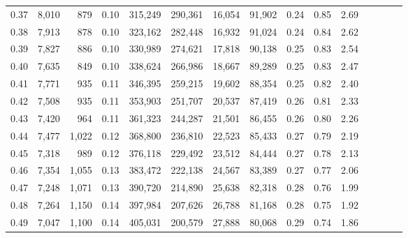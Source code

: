 \begin{tabular}{rrrcrrrrrrrrrrr}
0.37 &   8,010 &    879 &                                       0.10 &  315,249 &  290,361 &   16,054 &   91,902 &  0.24 &  0.85 &                         2.69 \\
0.38 &   7,913 &    878 &                                       0.10 &  323,162 &  282,448 &   16,932 &   91,024 &  0.24 &  0.84 &                         2.62 \\
0.39 &   7,827 &    886 &                                       0.10 &  330,989 &  274,621 &   17,818 &   90,138 &  0.25 &  0.83 &                         2.54 \\
0.40 &   7,635 &    849 &                                       0.10 &  338,624 &  266,986 &   18,667 &   89,289 &  0.25 &  0.83 &                         2.47 \\
0.41 &   7,771 &    935 &                                       0.11 &  346,395 &  259,215 &   19,602 &   88,354 &  0.25 &  0.82 &                         2.40 \\
0.42 &   7,508 &    935 &                                       0.11 &  353,903 &  251,707 &   20,537 &   87,419 &  0.26 &  0.81 &                         2.33 \\
0.43 &   7,420 &    964 &                                       0.11 &  361,323 &  244,287 &   21,501 &   86,455 &  0.26 &  0.80 &                         2.26 \\
0.44 &   7,477 &  1,022 &                                       0.12 &  368,800 &  236,810 &   22,523 &   85,433 &  0.27 &  0.79 &                         2.19 \\
0.45 &   7,318 &    989 &                                       0.12 &  376,118 &  229,492 &   23,512 &   84,444 &  0.27 &  0.78 &                         2.13 \\
0.46 &   7,354 &  1,055 &                                       0.13 &  383,472 &  222,138 &   24,567 &   83,389 &  0.27 &  0.77 &                         2.06 \\
0.47 &   7,248 &  1,071 &                                       0.13 &  390,720 &  214,890 &   25,638 &   82,318 &  0.28 &  0.76 &                         1.99 \\
0.48 &   7,264 &  1,150 &                                       0.14 &  397,984 &  207,626 &   26,788 &   81,168 &  0.28 &  0.75 &                         1.92 \\
0.49 &   7,047 &  1,100 &                                       0.14 &  405,031 &  200,579 &   27,888 &   80,068 &  0.29 &  0.74 &                         1.86 \\

\end{tabular}
